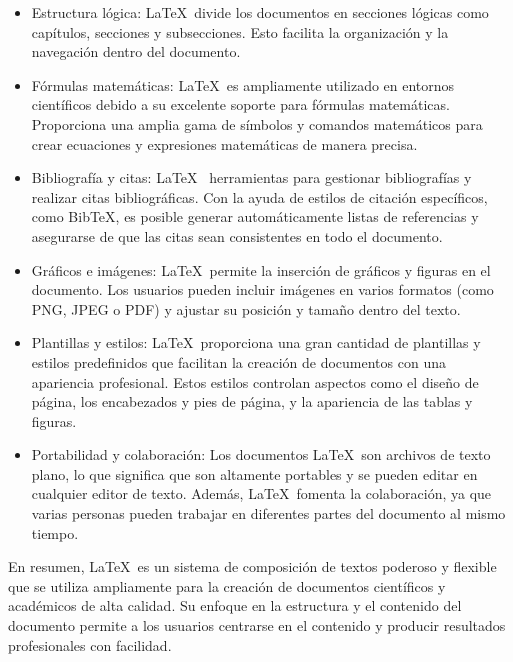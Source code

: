 \documentclass[a4paper, 12pt]{book}
\begin{document}
\begin{itemize}

\item Estructura lógica: \LaTeX~divide los documentos en secciones lógicas como capítulos, secciones y subsecciones. Esto facilita la organización y la navegación dentro del documento.

\item Fórmulas matemáticas: \LaTeX~es ampliamente utilizado en entornos científicos debido a su excelente soporte para fórmulas matemáticas. Proporciona una amplia gama de símbolos y comandos matemáticos para crear ecuaciones y expresiones matemáticas de manera precisa.

\item Bibliografía y citas: \LaTeX~ herramientas para gestionar bibliografías y realizar citas bibliográficas. Con la ayuda de estilos de citación específicos, como BibTeX, es posible generar automáticamente listas de referencias y asegurarse de que las citas sean consistentes en todo el documento.

\item Gráficos e imágenes: \LaTeX~permite la inserción de gráficos y figuras en el documento. Los usuarios pueden incluir imágenes en varios formatos (como PNG, JPEG o PDF) y ajustar su posición y tamaño dentro del texto.

\item Plantillas y estilos: \LaTeX~proporciona una gran cantidad de plantillas y estilos predefinidos que facilitan la creación de documentos con una apariencia profesional. Estos estilos controlan aspectos como el diseño de página, los encabezados y pies de página, y la apariencia de las tablas y figuras.

\item Portabilidad y colaboración: Los documentos \LaTeX~son archivos de texto plano, lo que significa que son altamente portables y se pueden editar en cualquier editor de texto. Además, \LaTeX~fomenta la colaboración, ya que varias personas pueden trabajar en diferentes partes del documento al mismo tiempo.
\end{itemize}

En resumen, \LaTeX~es un sistema de composición de textos poderoso y flexible que se utiliza ampliamente para la creación de documentos científicos y académicos de alta calidad. Su enfoque en la estructura y el contenido del documento permite a los usuarios centrarse en el contenido y producir resultados profesionales con facilidad.
\end{document}
